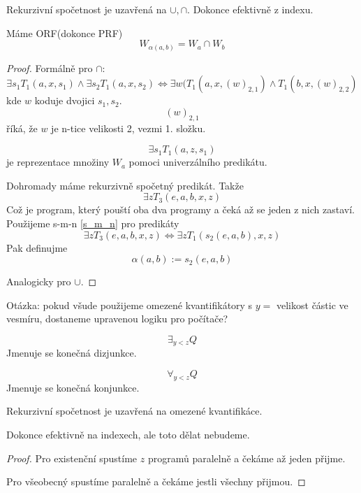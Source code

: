 \begin{theorem}[Uzavřenost RS]
	Rekurzivní spočetnost je uzavřená na $\cup, \cap$.
	Dokonce efektivně z indexu.

	Máme ORF(dokonce PRF)
	\[ W_{\alpha(a, b)} = W_a \cap W_b \]
\end{theorem}
\begin{proof}
	Formálně pro $\cap$:
	\[ \exists s_1 T_1(a, x, s_1) \land \exists s_2 T_1(a, x, s_2) \iff \exists w(T_1(a, x, (w)_{2,1}) \land T_1(b, x, (w)_{2,2}) \]
	kde $w$ koduje dvojici $s_1, s_2$.
	\[ (w)_{2,1} \]
	říká, že $w$ je n-tice velikosti 2, vezmi 1. složku.

	\[ \exists s_1 T_1(a, z, s_1) \]
	je reprezentace množiny $W_a$ pomoci univerzálního predikátu.

	Dohromady máme rekurzivně spočetný predikát. Takže
	\[ \exists z T_3(e, a, b, x, z) \]
	Což je program, který pouští oba dva programy a čeká až se jeden z nich zastaví.
	Použijeme s-m-n \cref{s_m_n} pro predikáty
	\[ \exists z T_3(e, a, b, x, z) \iff \exists z T_1(s_2(e, a, b), x , z) \]
	Pak definujme
	\[ \alpha(a, b) := s_2(e, a, b) \]

	Analogicky pro $\cup$.
\end{proof}

Otázka: pokud všude použijeme omezené kvantifikátory s $y =$ velikost částic ve vesmíru, dostaneme upravenou logiku pro počítače?

\begin{definition}
	\[ \exists_{y < z} Q \]
	Jmenuje se konečná dizjunkce.
\end{definition}

\begin{definition}
	\[ \forall_{y < z} Q \]
	Jmenuje se konečná konjunkce.
\end{definition}

\begin{theorem}\label{omez_kvant}
	Rekurzivní spočetnost je uzavřená na omezené kvantifikáce.

	Dokonce efektivně na indexech, ale toto dělat nebudeme.
\end{theorem}
\begin{proof}
	Pro existenční spustíme $z$ programů paralelně a čekáme až jeden přijme.

	Pro všeobecný spustíme paralelně a čekáme jestli všechny přijmou.
\end{proof}


